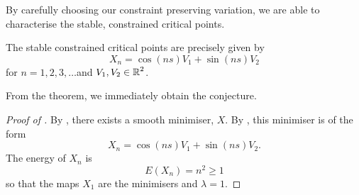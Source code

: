 \documentclass[12pt]{article}
\begin{document}
By carefully choosing our constraint preserving variation, we are able to characterise the stable, constrained critical points.

\begin{thm}
\label{thm:main}
The stable constrained critical points are precisely given by
\[
X_n = \cos (n s) V_1 + \sin (n s) V_2
\]
for \(n = 1, 2, 3, \dots\)and \(V_1, V_2 \in \operatorname{\mathbb{R}}^2\).
\end{thm}

From the theorem, we immediately obtain the conjecture.

\begin{proof}[Proof of ]
By \cite[Theorem 1.1]{denzler2015existence}, there exists a smooth minimiser, \(X\). By , this minimiser is of the form
\[
X_n = \cos (n s) V_1 + \sin (n s) V_2.
\]
The energy of \(X_n\) is
\[
E(X_n) = n^2 \geq 1
\]
so that the maps \(X_1\) are the minimisers and \(\lambda = 1\).
\end{proof}
\end{document}
